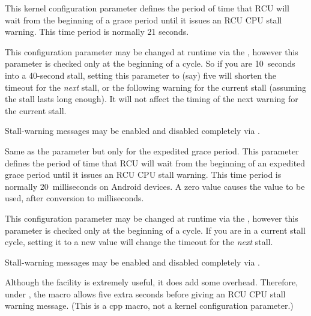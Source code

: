 \begin{description}[style=nextline]
\item[\tco{CONFIG_RCU_CPU_STALL_TIMEOUT}]
	This kernel configuration parameter defines the period of time
	that RCU will wait from the beginning of a grace period until it
	issues an RCU CPU stall warning.
	This time period is normally
	21 seconds.

	This configuration parameter may be changed at runtime via the
	, however
	this parameter is checked only at the beginning of a cycle.
	So if you are 10~seconds into a 40-second stall, setting this
	 parameter to (say) five will shorten the timeout for the
	\emph{next} stall, or the following warning for the current stall
	(assuming the stall lasts long enough).
	It will not affect the
	timing of the next warning for the current stall.

	Stall-warning messages may be enabled and disabled completely via
	.

\item[\tco{CONFIG_RCU_EXP_CPU_STALL_TIMEOUT}]
	Same as the  parameter but only for
	the expedited grace period.
        This parameter defines the period
	of time that RCU will wait from the beginning of an expedited
	grace period until it issues an RCU CPU stall warning.
	This time
	period is normally 20~milliseconds on Android devices.
	A zero
	value causes the  value to be used,
	after conversion to milliseconds.

	This configuration parameter may be changed at runtime via the
	, however
	this parameter is checked only at the beginning of a cycle.
	If you
	are in a current stall cycle, setting it to a new value will change
	the timeout for the \emph{next} stall.

	Stall-warning messages may be enabled and disabled completely via
	.

\item[\tco{RCU_STALL_DELAY_DELTA}]
	Although the  facility is extremely useful, it does add
	some overhead.
	Therefore, under , the
	 macro allows five extra seconds before
	giving an RCU CPU stall warning message.
	(This is a cpp
	macro, not a kernel configuration parameter.)


\end{description}

